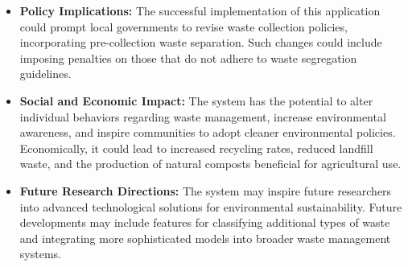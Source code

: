 \begin{itemize}
	\item \textbf{Policy Implications:} The successful implementation of this application could prompt local governments to revise waste collection policies, incorporating pre-collection waste separation. Such changes could include imposing penalties on those that do not adhere to waste segregation guidelines.
	
	\item \textbf{Social and Economic Impact:} The system has the potential to alter individual behaviors regarding waste management, increase environmental awareness, and inspire communities to adopt cleaner environmental policies. Economically, it could lead to increased recycling rates, reduced landfill waste, and the production of natural composts beneficial for agricultural use.
	
	\item \textbf{Future Research Directions:} The system may inspire future researchers into advanced technological solutions for environmental sustainability. Future developments may include features for classifying additional types of waste and integrating more sophisticated models into broader waste management systems.
\end{itemize}